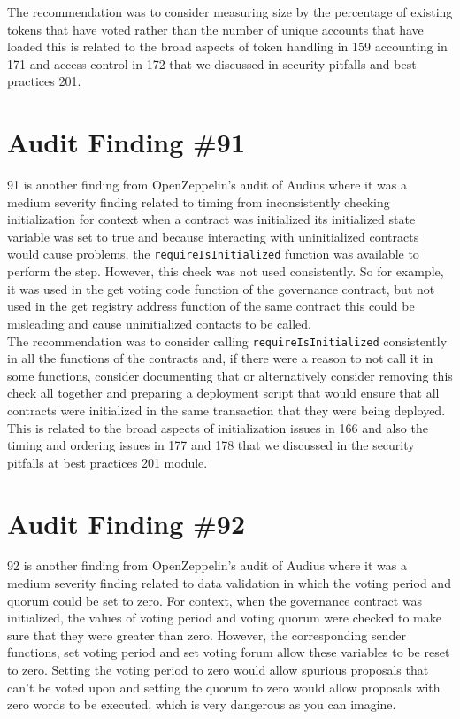 The recommendation was to consider measuring size by the percentage of existing tokens that have voted rather than the number of unique accounts that have loaded this is related to the broad aspects of token handling in 159 accounting in 171 and access control in 172 that we discussed in security pitfalls and best practices 201.

\section{Audit Finding \#91}

91 is another finding from OpenZeppelin's audit of Audius where it was a medium severity finding related to timing from inconsistently checking initialization for context when a contract was initialized its initialized state variable was set to true and because interacting with uninitialized contracts would cause problems, the \verb|requireIsInitialized| function was available to perform the step. However, this check was not used consistently. So for example, it was used in the get voting code function of the governance contract, but not used in the get registry address function of the same contract this could be misleading and cause uninitialized contacts to be called.\\

The recommendation was to consider calling \verb|requireIsInitialized| consistently in all the functions of the contracts and, if there were a reason to not call it in some functions, consider documenting that or alternatively consider removing this check all together and preparing a deployment script that would ensure that all contracts were initialized in the same transaction that they were being deployed. This is related to the broad aspects of initialization issues in 166 and also the timing and ordering issues in 177 and 178 that we discussed in the security pitfalls at best practices 201 module.

\section{Audit Finding \#92}

92 is another finding from OpenZeppelin's audit of Audius where it was a medium severity finding related to data validation in which the voting period and quorum could be set to zero. For context, when the governance contract was initialized, the values of voting period and voting quorum were checked to make sure that they were greater than zero. However, the corresponding sender functions, set voting period and set voting forum allow these variables to be reset to zero. Setting the voting period to zero would allow spurious proposals that can't be voted upon and setting the quorum to zero would allow proposals with zero words to be executed, which is very dangerous as you can imagine.\\


